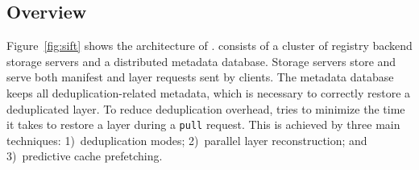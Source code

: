 \subsection{Overview}
\label{sec:overview}


%



Figure~\ref{fig:sift} shows the architecture of \sysname.
\sysname consists of a cluster of registry backend storage servers and a distributed metadata database. 
Storage servers store and serve both manifest and layer requests sent by clients. The
metadata database keeps all deduplication-related metadata, which is necessary to correctly restore
a deduplicated layer.
%
To reduce deduplication overhead, \sysname tries to minimize the time it takes to restore a layer
during a \texttt{pull} request. This is achieved by three main techniques: 1)~deduplication modes;
2)~parallel layer reconstruction; and 3)~predictive cache prefetching.

